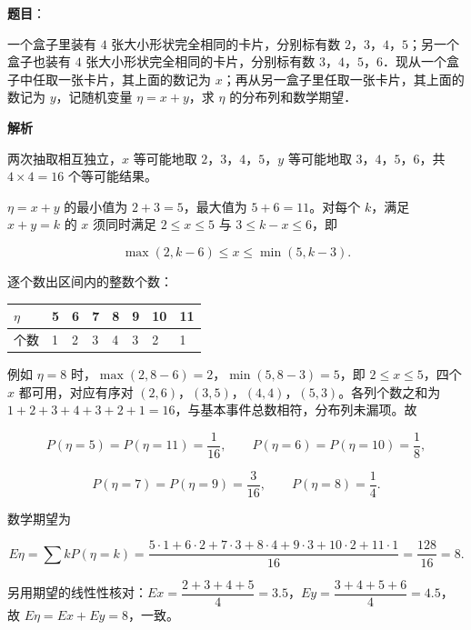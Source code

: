 \begin{answer}

\textbf{题目}：

一个盒子里装有 $4$ 张大小形状完全相同的卡片，分别标有数 $2$，$3$，$4$，$5$；另一个盒子也装有 $4$ 张大小形状完全相同的卡片，分别标有数 $3$，$4$，$5$，$6$．现从一个盒子中任取一张卡片，其上面的数记为 $x$；再从另一盒子里任取一张卡片，其上面的数记为 $y$，记随机变量 $\eta=x+y$，求 $\eta$ 的分布列和数学期望．

\textbf{解析}

两次抽取相互独立，$x$ 等可能地取 $2$，$3$，$4$，$5$，$y$ 等可能地取 $3$，$4$，$5$，$6$，共 $4\times4=16$ 个等可能结果。

$\eta=x+y$ 的最小值为 $2+3=5$，最大值为 $5+6=11$。对每个 $k$，满足 $x+y=k$ 的 $x$ 须同时满足 $2\leqslant x\leqslant5$ 与 $3\leqslant k-x\leqslant6$，即

\nopagebreak[4]
\[\max(2,k-6)\leqslant x\leqslant\min(5,k-3).\]

逐个数出区间内的整数个数：

\begin{center}
\begingroup\setlength{\tabcolsep}{4pt}
\begin{tabular}{llllllll}
\toprule
$\eta$ & 5 & 6 & 7 & 8 & 9 & 10 & 11 \\
\midrule
个数 & 1 & 2 & 3 & 4 & 3 & 2 & 1 \\
\bottomrule
\end{tabular}
\endgroup
\end{center}

例如 $\eta=8$ 时，$\max(2,8-6)=2$，$\min(5,8-3)=5$，即 $2\leqslant x\leqslant5$，四个 $x$ 都可用，对应有序对 $(2,6)$，$(3,5)$，$(4,4)$，$(5,3)$。各列个数之和为 $1+2+3+4+3+2+1=16$，与基本事件总数相符，分布列未漏项。故

\nopagebreak[4]
\[P(\eta=5)=P(\eta=11)=\frac1{16},\qquad P(\eta=6)=P(\eta=10)=\frac18,\]

\nopagebreak[4]
\[P(\eta=7)=P(\eta=9)=\frac3{16},\qquad P(\eta=8)=\frac14.\]

数学期望为

\nopagebreak[4]
\[E\eta=\sum kP(\eta=k)=\frac{5\cdot1+6\cdot2+7\cdot3+8\cdot4+9\cdot3+10\cdot2+11\cdot1}{16}=\frac{128}{16}=8.\]

另用期望的线性性核对：$Ex=\dfrac{2+3+4+5}{4}=3.5$，$Ey=\dfrac{3+4+5+6}{4}=4.5$，故 $E\eta=Ex+Ey=8$，一致。


\end{answer}
